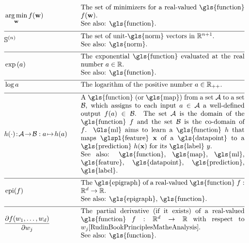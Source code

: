 \newpage
\begin{align}
    	&\aargmin_{\weights} f(\weights) &\quad &\parbox{.70\textwidth}{The set of minimizers for a real-valued \gls{function} $f(\weights)$. 
    		\\ See also: \gls{function}. } \nonumber \\[2mm] \hline \nonumber\\[-5mm]
    	&\sphere{\nrnodes} &\quad &\parbox{.70\textwidth}{The set of unit-\gls{norm} vectors in $\mathbb{R}^{\nrnodes+1}$.
    		\\ See also: \gls{norm}. }\nonumber \\[2mm] \hline \nonumber\\[-5mm]
	&\exp\,(a) &\quad &\parbox{.70\textwidth}{The exponential \gls{function} evaluated at the real number $a \in \mathbb{R}$.
		\\ See also: \gls{function}. } \nonumber \\[2mm] \hline \nonumber\\[-5mm]
	&\log a &\quad &\mbox{The logarithm of the positive number $a \in \mathbb{R}_{++}$.  } \nonumber \\[2mm] \hline \nonumber\\[-5mm]
	&\hypothesis(\cdot)\!:\!\mathcal{A}\!\rightarrow\!\mathcal{B} :  a \!\mapsto\!h(a) &\quad &\parbox{.70\textwidth}{
	 	A \gls{function} (or \gls{map}) from a set $\mathcal{A}$ to a set $\mathcal{B}$, which assigns to each input 
	 	$a \in \mathcal{A}$ a well-defined output $f(a) \in \mathcal{B}$.
	 	The set $\mathcal{A}$ is the domain of the \gls{function} $f$ and the set $\mathcal{B}$ is the 
	 	co-domain of $f$. \Gls{ml} aims to learn a \gls{function} $\hypothesis$ that maps \glspl{feature} 
	 	$\featurevec$ of a \gls{datapoint} to a \gls{prediction} $\hypothesis(\featurevec)$ for its \gls{label} $\truelabel$.
		\\ See also: \gls{function}, \gls{map}, \gls{ml}, \gls{feature}, \gls{datapoint}, \gls{prediction}, \gls{label}.} \nonumber \\[2mm] \hline \nonumber\\[-5mm]
	&\operatorname{epi}(f)  & \quad & \parbox{.70\textwidth}{The \gls{epigraph} of a real-valued \gls{function} 
	 	$f: \mathbb{R}^{\featuredim}\rightarrow \mathbb{R}$.
		\\ See also: \gls{epigraph}, \gls{function}. } \nonumber \\[2mm]  \hline \nonumber\\[-5mm]
	&  \frac{\partial f(\weight_{1}, \ldots, \weight_{\nrfeatures})}{\partial \weight_{\featureidx}} & \quad & \parbox{.70\textwidth}{The partial derivative (if it exists) of 
	 	a real-valued \gls{function} $f: \mathbb{R}^{\featuredim}\rightarrow \mathbb{R}$ with respect to\ $\weight_{\featureidx}$\cite[Ch. 9]{RudinBookPrinciplesMatheAnalysis}.
		\\ See also: \gls{function}. } \nonumber 
\end{align} 

